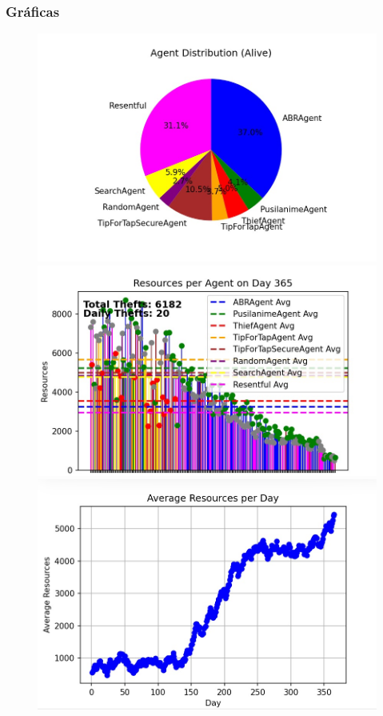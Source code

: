\documentclass{article}
\begin{document}
\subsubsection{Gr\'aficas}
\begin{figure}[h]
      \centering
      \begin{minipage}{0.32\textwidth}
            \centering
            \includegraphics[width=\textwidth]{population_1.jpg}
      \end{minipage}\hfill
      \begin{minipage}{0.32\textwidth}
            \centering
            \includegraphics[width=\textwidth]{agents_1.jpg}
      \end{minipage}\hfill
      \begin{minipage}{0.32\textwidth}
            \centering
            \includegraphics[width=\textwidth]{resources_1.jpg}

\end{minipage}
\end{figure}
\end{document}
